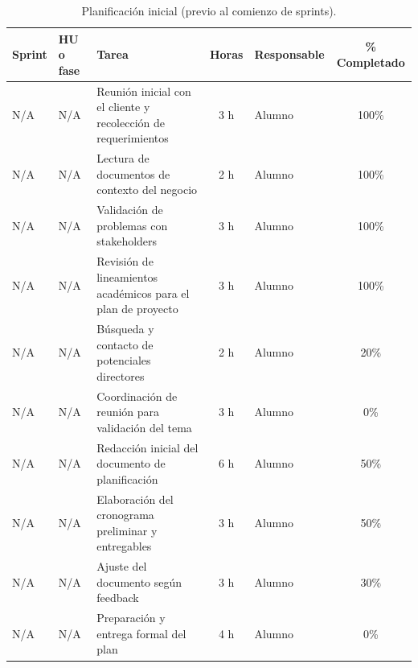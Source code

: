\documentclass[
11pt, %
]{charter}
\begin{document}
\begin{table}[htpb]
\centering
\caption{Planificación inicial (previo al comienzo de sprints).}
\begin{tabularx}{\linewidth}{@{}|l|l|X|c|l|c|@{}}
\hline
\rowcolor[HTML]{C0C0C0}
Sprint & HU o fase & Tarea & Horas & Responsable & \% Completado \\ \hline
N/A & N/A & Reunión inicial con el cliente y recolección de requerimientos & 3 h & Alumno & 100\% \\ \hline
N/A & N/A & Lectura de documentos de contexto del negocio & 2 h & Alumno & 100\% \\ \hline
N/A & N/A & Validación de problemas con stakeholders & 3 h & Alumno & 100\% \\ \hline
N/A & N/A & Revisión de lineamientos académicos para el plan de proyecto & 3 h & Alumno & 100\% \\ \hline
N/A & N/A & Búsqueda y contacto de potenciales directores & 2 h & Alumno & 20\% \\ \hline
N/A & N/A & Coordinación de reunión para validación del tema & 3 h & Alumno & 0\% \\ \hline
N/A & N/A & Redacción inicial del documento de planificación & 6 h & Alumno & 50\% \\ \hline
N/A & N/A & Elaboración del cronograma preliminar y entregables & 3 h & Alumno & 50\% \\ \hline
N/A & N/A & Ajuste del documento según feedback & 3 h & Alumno & 30\% \\ \hline
N/A & N/A & Preparación y entrega formal del plan & 4 h & Alumno & 0\% \\ \hline
\end{tabularx}
\end{table}
\end{document}
